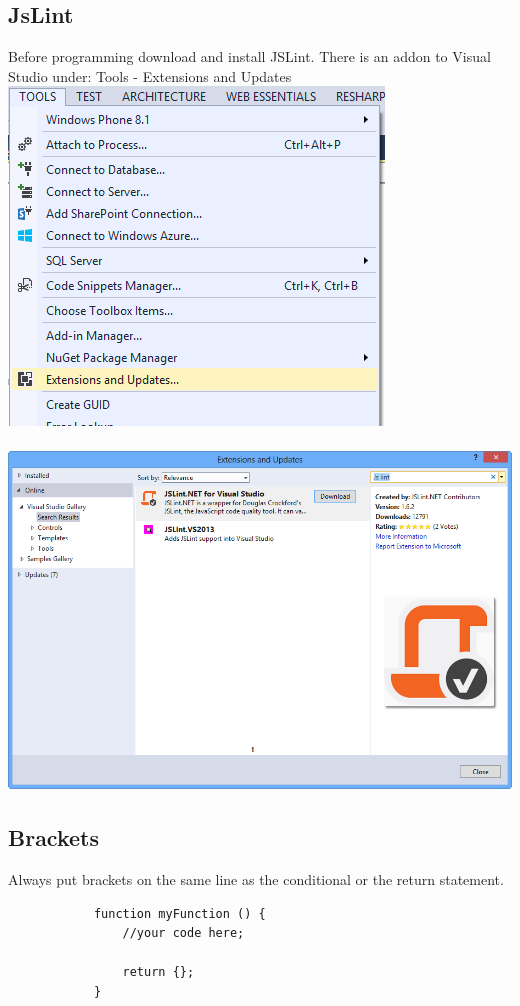 \documentclass {article}
\begin{document}
	\subsection{JsLint}
		Before programming download and install JSLint.  There is an addon to Visual Studio under: Tools - Extensions and Updates
		\\
		\includegraphics[scale=.75]{ToolsExtensionsAndAddons.png}
		\\
		\\
		\includegraphics[scale=.45]{JsLintAddOn.png}
	\subsection {Brackets}

		Always put brackets on the same line as the conditional or the return statement.

		\begin{lstlisting}
			function myFunction () {
				//your code here;

				return {};
			}
		\end{lstlisting}	
\end{document}
